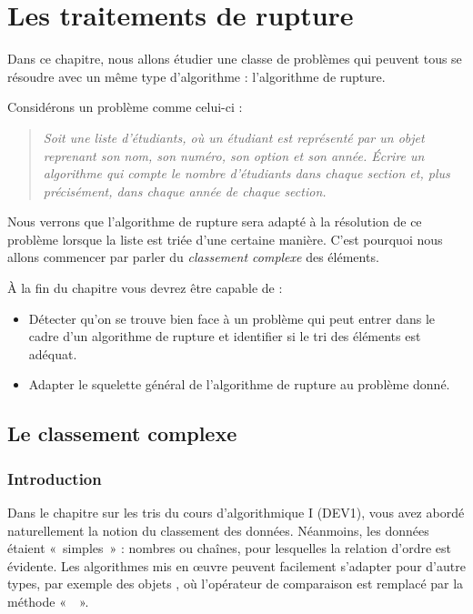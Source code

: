 \chapter{Les traitements de rupture}
\label{chap:rupture}

	Dans ce chapitre, nous allons étudier une classe de problèmes 
	qui peuvent tous se résoudre avec un même type d'algorithme :
	l'algorithme de rupture. 
	
	Considérons un problème comme celui-ci :
	\begin{quotation}
		\slshape
		\og{}Soit une liste d'étudiants, 
		où un étudiant est représenté par un objet reprenant son nom,
		son numéro, son option et son année.
		Écrire un algorithme qui compte le nombre d'étudiants dans chaque section
		et, plus précisément, dans chaque année de chaque section.\fg{}
	\end{quotation}
	
	Nous verrons que l'algorithme de rupture sera adapté à la résolution de
        ce problème lorsque la liste est triée d'une certaine manière.
	C'est pourquoi nous allons commencer par parler du \emph{classement complexe}
	des éléments.
	
	À la fin du chapitre vous
	devrez être capable de :	
	\begin{itemize}
		\item 
			Détecter qu'on se trouve bien face à un problème qui
			peut entrer dans le cadre d'un algorithme de rupture
			et identifier si le tri des éléments est adéquat.
		\item 
			Adapter le squelette général de l'algorithme de rupture
			au problème donné.
	\end{itemize}

\section{Le classement complexe}

\subsection*{Introduction}

	Dans le chapitre sur les tris du cours d'algorithmique I (DEV1), 
	vous avez abordé naturellement la notion du classement des données. 
	Néanmoins, les données étaient «~simples~» : 
	nombres ou chaînes, pour lesquelles la relation d’ordre est évidente. 
	Les algorithmes mis en œuvre peuvent facilement s’adapter pour d’autre types, 
	par exemple des objets , où l’opérateur de comparaison est remplacé par la méthode
	«~~».
	

